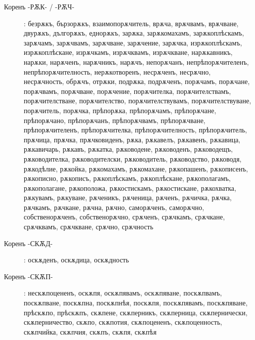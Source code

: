 \documentclass{article}
\begin{document}
\begin{description}
		\item[Коренъ -РѪК- / -РѪЧ-]: безрѫкъ, бързорѫкъ, взаимопорѫчитель, врѫча, врѫчвамъ, врѫчване, двурѫкъ, дългорѫкъ, еднорѫкъ, зарѫка, зарѫкомахамъ, зарѫкоплѣскамъ, зарѫчамъ, зарѫчвамъ, зарѫчване, зарѫчение, зарѫчка, изрѫкоплѣскамъ, изрѫкоплѣскане, изрѫчкамъ, изрѫчквамъ, изрѫчкване, нарѫкавникъ, нарѫки, нарѫченъ, нарѫчникъ, нарѫчъ, непорѫчанъ, непрѣпорѫчителенъ, непрѣпорѫчителность, нерѫкотворенъ, несрѫченъ, несрѫчно, несрѫчность, обрѫчъ, отрѫки, подрѫка, подрѫченъ, порѫчамъ, порѫчане, порѫчвамъ, порѫчване, порѫчение, порѫчителка, порѫчителствамъ, порѫчителстване, порѫчителство, порѫчителствувамъ, порѫчителствуване, порѫчитель, порѫчка, прѣпорѫка, прѣпорѫчамъ, прѣпорѫчане, прѣпорѫчано, прѣпорѫчанъ, прѣпорѫчвамъ, прѣпорѫчване, прѣпорѫчителенъ, прѣпорѫчителка, прѣпорѫчителность, прѣпорѫчитель, прѫчица, прѫчка, прѫчковиденъ, рѫка, рѫкавелъ, рѫкавенъ, рѫкавица, рѫкавичарь, рѫкавъ, рѫкатка, рѫководене, рѫководенъ, рѫководещъ, рѫководителка, рѫководителски, рѫководитель, рѫководство, рѫководя, рѫкодѣлие, рѫкойка, рѫкомахамъ, рѫкомахане, рѫкопашенъ, рѫкописенъ, рѫкописно, рѫкописъ, рѫкоплѣскамъ, рѫкоплѣскане, рѫкополагамъ, рѫкополагане, рѫкоположа, рѫкостискамъ, рѫкостискане, рѫкохватка, рѫкувамъ, рѫкуване, рѫченикъ, рѫченица, рѫченъ, рѫчичка, рѫчка, рѫчкамъ, рѫчкане, рѫчна, рѫчно, саморѫченъ, саморѫчно, собственорѫченъ, собственорѫчно, срѫченъ, срѫчкамъ, срѫчкане, срѫчквамъ, срѫчкване, срѫчно, срѫчность
		
		\item[Коренъ -СКѪД-]: оскѫденъ, оскѫдица, оскѫдность
		
		\item[Коренъ -СКѪП-]: нескѫпоцененъ, оскѫпя, оскѫпявамъ, оскѫпяване, поскѫпвамъ, поскѫпване, поскѫпна, поскѫпнѣя, поскѫпя, поскѫпявамъ, поскѫпяване, прѣскѫпо, прѣскѫпъ,
		 скѫпене, скѫперникъ, скѫперница, скѫпернически, скѫперничество, скѫпо, скѫпотия, скѫпоцененъ, скѫпоценность, скѫпчийка, скѫпчия, скѫпъ, скѫпя, скѫпѣя
		

\end{description}
\end{document}
